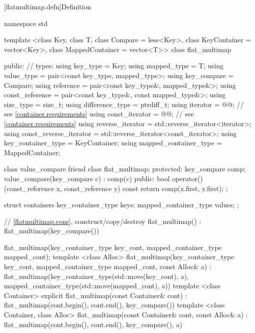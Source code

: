 \begin{codeblock}
\begin{codeblock}
\begin{codeblock}
\begin{addedblock}
[flatmultimap.defn]{Definition}

\begin{codeblock}
namespace std {
  template <class Key, class T, class Compare = less<Key>,
            class KeyContainer = vector<Key>,
            class MappedContainer = vector<T>>
  class flat_multimap {
  public:
    // types:
    using key_type                  = Key;
    using mapped_type               = T;
    using value_type                = pair<const key_type, mapped_type>;
    using key_compare               = Compare;
    using reference                 = pair<const key_type&, mapped_type&>;
    using const_reference           = pair<const key_type&, const mapped_type&>;
    using size_type                 = size_t;
    using difference_type           = ptrdiff_t;
    using iterator                  = @@; // see \ref{container.requirements}
    using const_iterator            = @@; // see \ref{container.requirements}
    using reverse_iterator          = std::reverse_iterator<iterator>;
    using const_reverse_iterator    = std::reverse_iterator<const_iterator>;
    using key_container_type        = KeyContainer;
    using mapped_container_type     = MappedContainer;

    class value_compare {
      friend class flat_multimap;
    protected:
      key_compare comp;
      value_compare(key_compare c) : comp(c) { }
    public:
      bool operator()(const_reference x, const_reference y) const {
        return comp(x.first, y.first);
      }
    };

    struct containers
    {
      key_container_type keys;
      mapped_container_type values;
    };

    // \ref{flatmultimap.cons}, construct/copy/destroy
    flat_multimap() : flat_multimap(key_compare()) { }

    flat_multimap(key_container_type key_cont, mapped_container_type mapped_cont);
    template <class Alloc>
    flat_multimap(key_container_type key_cont, mapped_container_type mapped_cont,
                  const Alloc& a)
        : flat_multimap(key_container_type(std::move(key_cont), a),
                        mapped_container_type(std::move(mapped_cont), a))
      { }
    template <class Container>
      explicit flat_multimap(const Container& cont)
        : flat_multimap(cont.begin(), cont.end(), key_compare()) { }
    template <class Container, class Alloc>
      flat_multimap(const Container& cont, const Alloc& a)
        : flat_multimap(cont.begin(), cont.end(), key_compare(), a) { }

}}
\end{codeblock}
\end{addedblock}
\end{codeblock}
\end{codeblock}
\end{codeblock}
